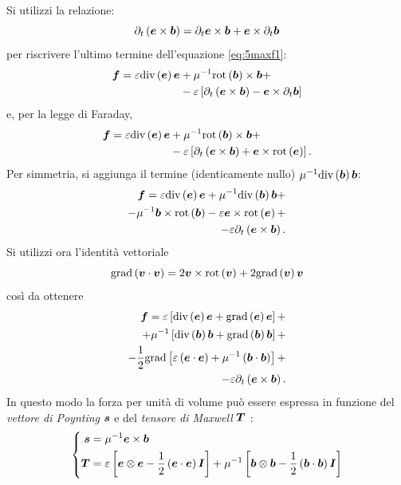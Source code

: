 Si utilizzi la relazione:
\begin{equation}
\label{eq:5vectid}
\partial_t\left(\boldsymbol{e}\times\boldsymbol{b}\right) = \partial_t \boldsymbol{e}\times \boldsymbol{b} + \boldsymbol{e}\times\partial_t\boldsymbol{b}
\end{equation}
per riscrivere l'ultimo termine dell'equazione \eqref{eq:5maxf1}:
\begin{align}
\label{eq:5maxf2}
\boldsymbol{f}=\varepsilon\text{div}\left(\boldsymbol{e}\right) \boldsymbol{e} &+\mu^{-1}\text{rot}\left(\boldsymbol{b}\right)\times \boldsymbol{b}+\nonumber\\
&-\varepsilon \left[\partial_t\left(\boldsymbol{e}\times\boldsymbol{b}\right)-\boldsymbol{e}\times\partial_t\boldsymbol{b}\right]
\end{align}
e, per la legge di Faraday,
\begin{align}
\label{eq:5maxf3}
\boldsymbol{f}=\varepsilon\text{div}\left(\boldsymbol{e}\right) \boldsymbol{e} &+\mu^{-1}\text{rot}\left(\boldsymbol{b}\right)\times \boldsymbol{b}+\nonumber\\
&-\varepsilon \left[\partial_t\left(\boldsymbol{e}\times\boldsymbol{b}\right)+\boldsymbol{e}\times\text{rot}\left(\boldsymbol{e}\right)\right].
\end{align}
Per simmetria, si aggiunga il termine (identicamente nullo) $\mu^{-1} \text{div}\left(\boldsymbol{b}\right)\boldsymbol{b}$:
\begin{align}
\label{eq:5maxf4}
\boldsymbol{f}=\varepsilon\text{div}\left(\boldsymbol{e}\right) \boldsymbol{e} +\mu^{-1} \text{div}\left(\boldsymbol{b}\right)\boldsymbol{b}+\nonumber\\
-\mu^{-1}\boldsymbol{b}\times\text{rot}\left(\boldsymbol{b}\right) -\varepsilon\boldsymbol{e}\times\text{rot}\left(\boldsymbol{e}\right)+\nonumber\\
-\varepsilon\partial_t\left(\boldsymbol{e}\times\boldsymbol{b}\right).
\end{align}
Si utilizzi ora l'identità vettoriale
\begin{equation}
\label{eq:5vectid2}
\text{grad}\left(\boldsymbol{v}\cdot\boldsymbol{v}\right) = 2 \boldsymbol{v}\times\text{rot}\left(\boldsymbol{v}\right)+2\text{grad}\left(\boldsymbol{v}\right)\boldsymbol{v}
\end{equation}
così da ottenere
\begin{align}
\label{eq:5maxf5}
\boldsymbol{f}=\varepsilon \left[ \text{div} \left( \boldsymbol{e} \right) \boldsymbol{e} + \text{grad} \left( \boldsymbol{e} \right) \boldsymbol{e} \right] +\nonumber\\
+\mu^{-1} \left[\text{div}\left(\boldsymbol{b}\right)\boldsymbol{b}+\text{grad}\left(\boldsymbol{b}\right)\boldsymbol{b}\right] +\nonumber\\
-\frac{1}{2} \text{grad}\left[\varepsilon\left(\boldsymbol{e}\cdot\boldsymbol{e}\right)+
\mu^{-1}\left(\boldsymbol{b}\cdot\boldsymbol{b}\right) \right] +\nonumber\\
-\varepsilon\partial_t\left(\boldsymbol{e}\times\boldsymbol{b}\right).
\end{align}
In questo modo la forza per unità di volume può essere espressa in funzione del \textit{vettore di Poynting} $\boldsymbol{s}$ e del \textit{tensore di Maxwell} $\boldsymbol{T}$ \citep{griffiths_introduction_2013}:
\begin{equation}
\label{eq:5poyntandmax}
\left\{
\begin{aligned}
\boldsymbol{s} &= \mu^{-1} \boldsymbol{e}\times\boldsymbol{b}\\
\boldsymbol{T} &= \varepsilon\left[\boldsymbol{e}\otimes\boldsymbol{e} -\frac{1}{2}\left(\boldsymbol{e}\cdot\boldsymbol{e}\right)\boldsymbol{I}\right] +
\mu^{-1}\left[\boldsymbol{b}\otimes\boldsymbol{b} -\frac{1}{2}\left(\boldsymbol{b}\cdot\boldsymbol{b}\right)\boldsymbol{I}\right]
\end{aligned}
\right.
\end{equation}

